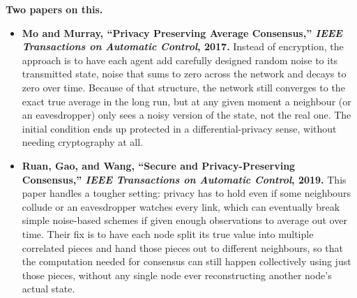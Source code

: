 \documentclass[a4paper, 11pt]{article}
\begin{document}
\begin{solution}
\noindent\textbf{Two papers on this.}
\begin{itemize}
    \item \textbf{Mo and Murray, ``Privacy Preserving Average Consensus,'' \emph{IEEE Transactions on Automatic Control}, 2017.} Instead of encryption, the approach is to have each agent add carefully designed random noise to its transmitted state, noise that sums to zero across the network and decays to zero over time. Because of that structure, the network still converges to the exact true average in the long run, but at any given moment a neighbour (or an eavesdropper) only sees a noisy version of the state, not the real one. The initial condition ends up protected in a differential-privacy sense, without needing cryptography at all.
    \item \textbf{Ruan, Gao, and Wang, ``Secure and Privacy-Preserving Consensus,'' \emph{IEEE Transactions on Automatic Control}, 2019.} This paper handles a tougher setting: privacy has to hold even if some neighbours collude or an eavesdropper watches every link, which can eventually break simple noise-based schemes if given enough observations to average out over time. Their fix is to have each node split its true value into multiple correlated pieces and hand those pieces out to different neighbours, so that the computation needed for consensus can still happen collectively using just those pieces, without any single node ever reconstructing another node's actual state.
\end{itemize}
\end{solution}
\problemend
\end{document}
